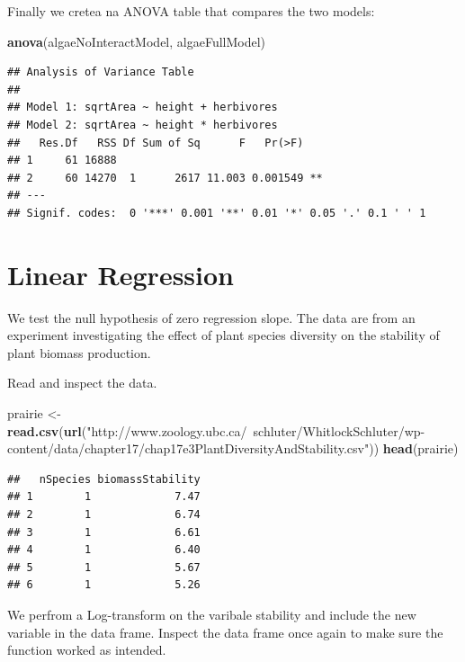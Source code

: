\documentclass[]{article}
\newenvironment{Shaded}{\begin{snugshade}}{\end{snugshade}}
\newcommand{\KeywordTok}[1]{\textcolor[rgb]{0.13,0.29,0.53}{\textbf{#1}}}
\newcommand{\NormalTok}[1]{#1}
\newcommand{\StringTok}[1]{\textcolor[rgb]{0.31,0.60,0.02}{#1}}
\begin{document}
Finally we cretea na ANOVA table that compares the two models:

\begin{Shaded}
\begin{Highlighting}[]
\KeywordTok{anova}\NormalTok{(algaeNoInteractModel, algaeFullModel)}
\end{Highlighting}
\end{Shaded}

\begin{verbatim}
## Analysis of Variance Table
## 
## Model 1: sqrtArea ~ height + herbivores
## Model 2: sqrtArea ~ height * herbivores
##   Res.Df   RSS Df Sum of Sq      F   Pr(>F)   
## 1     61 16888                                
## 2     60 14270  1      2617 11.003 0.001549 **
## ---
## Signif. codes:  0 '***' 0.001 '**' 0.01 '*' 0.05 '.' 0.1 ' ' 1
\end{verbatim}

\hypertarget{linear-regression}{%
\section{Linear Regression}\label{linear-regression}}

We test the null hypothesis of zero regression slope. The data are from
an experiment investigating the effect of plant species diversity on the
stability of plant biomass production.

Read and inspect the data.

\begin{Shaded}
\begin{Highlighting}[]
\NormalTok{prairie <-}\StringTok{ }\KeywordTok{read.csv}\NormalTok{(}\KeywordTok{url}\NormalTok{(}\StringTok{"http://www.zoology.ubc.ca/~schluter/WhitlockSchluter/wp-content/data/chapter17/chap17e3PlantDiversityAndStability.csv"}\NormalTok{))}
\KeywordTok{head}\NormalTok{(prairie)}
\end{Highlighting}
\end{Shaded}

\begin{verbatim}
##   nSpecies biomassStability
## 1        1             7.47
## 2        1             6.74
## 3        1             6.61
## 4        1             6.40
## 5        1             5.67
## 6        1             5.26
\end{verbatim}

We perfrom a Log-transform on the varibale stability and include the new
variable in the data frame. Inspect the data frame once again to make
sure the function worked as intended.
\end{document}

